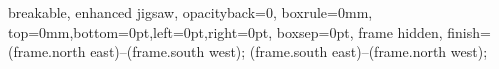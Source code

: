 
\usepackage[english]{babel}
\usepackage{lipsum}
\usepackage{blindtext}

\usepackage{tcolorbox}
%
{%
    breakable,%
    enhanced jigsaw,%
    opacityback=0,%
    boxrule=0mm,%
    top=0mm,bottom=0pt,left=0pt,right=0pt,%
    boxsep=0pt,%
    frame hidden,%
    finish={%
         (frame.north east)--(frame.south west);%
         (frame.south east)--(frame.north west);%
    }%
}%
